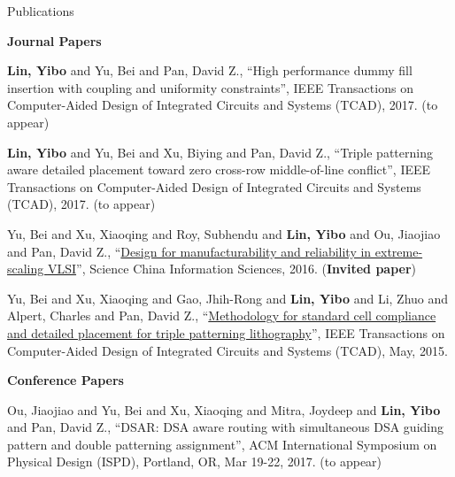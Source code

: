 \begin{rSection}{Publications}



\textbf{Journal Papers}
        

\begin{description}[font=\normalfont]
    

\item[{[J4]}]{
        \textbf{Lin, Yibo} and Yu, Bei and Pan, David Z., 
    ``High performance dummy fill insertion with coupling and uniformity constraints'', 
    IEEE Transactions on Computer-Aided Design of Integrated Circuits and Systems (TCAD), 2017.
    (to appear)
}
        

\item[{[J3]}]{
        \textbf{Lin, Yibo} and Yu, Bei and Xu, Biying and Pan, David Z., 
    ``Triple patterning aware detailed placement toward zero cross-row middle-of-line conflict'', 
    IEEE Transactions on Computer-Aided Design of Integrated Circuits and Systems (TCAD), 2017.
    (to appear)
}
        

\item[{[J2]}]{
        Yu, Bei and Xu, Xiaoqing and Roy, Subhendu and \textbf{Lin, Yibo} and Ou, Jiaojiao and Pan, David Z., 
    ``\href{http://link.springer.com/article/10.1007%2Fs11432-016-5560-6}{Design for manufacturability and reliability in extreme-scaling {VLSI}}'', 
    Science China Information Sciences, 2016.
    (\textbf{Invited paper})
}
        

\item[{[J1]}]{
        Yu, Bei and Xu, Xiaoqing and Gao, Jhih-Rong and \textbf{Lin, Yibo} and Li, Zhuo and Alpert, Charles and Pan, David Z., 
    ``\href{http://ieeexplore.ieee.org/xpl/articleDetails.jsp?tp=&arnumber=7036058}{Methodology for standard cell compliance and detailed placement for triple patterning lithography}'', 
    IEEE Transactions on Computer-Aided Design of Integrated Circuits and Systems (TCAD), May, 2015.
    
}
        

\end{description}
    

\textbf{Conference Papers}
        

\begin{description}[font=\normalfont]
    

\item[{[C9]}]{
        Ou, Jiaojiao and Yu, Bei and Xu, Xiaoqing and Mitra, Joydeep and \textbf{Lin, Yibo} and Pan, David Z., 
    ``DSAR: DSA aware routing with simultaneous DSA guiding pattern and double patterning assignment'', 
    ACM International Symposium on Physical Design (ISPD), Portland, OR, Mar 19-22, 2017.
    (to appear)
}
        


\end{description}
\end{rSection}
